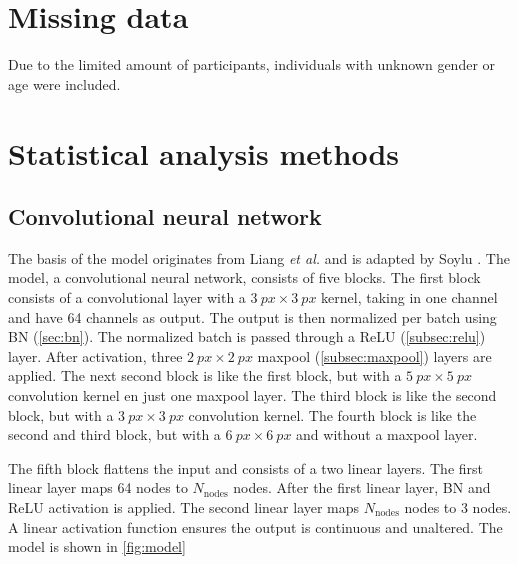 \section{Missing data}
Due to the limited amount of participants, individuals with unknown gender or age were included.

\section{Statistical analysis methods}

\subsection{Convolutional neural network}
The basis of the model originates from Liang \emph{et al.} \cite{Liang2017} and is adapted by Soylu \cite{Soylu2022}.
The model, a convolutional neural network, consists of five blocks.
The first block consists of a convolutional layer with a $\SI{3}{px}\times\SI{3}{px}$ kernel, taking in one channel and have 64 channels as output.
The output is then normalized per batch using BN (\cref{sec:bn}).
The normalized batch is passed through a ReLU (\cref{subsec:relu}) layer.
After activation, three $\SI{2}{px}\times\SI{2}{px}$ maxpool (\cref{subsec:maxpool}) layers are applied.
The next second block is like the first block, but with a $\SI{5}{px}\times\SI{5}{px}$ convolution kernel en just one maxpool layer.
The third block is like the second block, but with a $\SI{3}{px}\times\SI{3}{px}$ convolution kernel.
The fourth block is like the second and third block, but with a $\SI{6}{px}\times\SI{6}{px}$ and without a maxpool layer.

The fifth block flattens the input and consists of a two linear layers.
The first linear layer maps 64 nodes to $N_\mathrm{nodes}$ nodes.
After the first linear layer, BN and ReLU activation is applied.
The second linear layer maps $N_\mathrm{nodes}$ nodes to 3 nodes.
A linear activation function ensures the output is continuous and unaltered.
The model is shown in \cref{fig:model}


